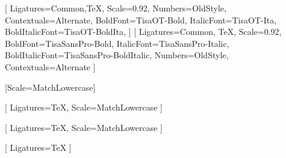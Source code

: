 %



\setmainfont{TisaOT}[
    Ligatures={Common,TeX},
    Scale=0.92, %
    Numbers={OldStyle},
    Contextuals={Alternate},
    BoldFont=TisaOT-Bold,
    ItalicFont=TisaOT-Ita,
    BoldItalicFont=TisaOT-BoldIta,
]
\setsansfont{TisaSansPro}[
    Ligatures={Common, TeX},
    Scale=0.92,
    BoldFont=TisaSansPro-Bold,
    ItalicFont=TisaSansPro-Italic,
    BoldItalicFont=TisaSansPro-BoldItalic,
    Numbers={OldStyle},
    Contextuals={Alternate}
]

\setmonofont{Iosevka}[Scale=MatchLowercase]

[
    Ligatures=TeX,
    Scale=MatchLowercase
]

\setmathfontface{}[
    Ligatures=TeX,
    Scale=MatchLowercase
]
\setoperatorfont\mathoper

\newfontface{}[
    Ligatures=TeX
]
